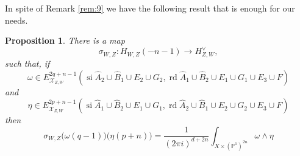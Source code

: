 \documentclass[11pt,a4paper]{amsart}
\renewcommand{\P}{\mathds{P}}
\newcommand{\caX}{\mathcal{X}}
\DeclareMathOperator{\si}{si}
\DeclareMathOperator{\rd}{rd}
\numberwithin{equation}{section}
\theoremstyle{plain}
\newtheorem{prop}{Proposition}[section]
\theoremstyle{definition}
\begin{document}
  In spite of Remark \ref{rem:9} we have the following result that is
  enough for our needs.
  \begin{prop}\label{prop:4} There is a map
    \begin{displaymath}
      \sigma_{W,Z}\colon H_{W,Z}(-n-1)\longrightarrow H_{Z,W}^{\vee},
    \end{displaymath}
    such that, if
    \begin{displaymath}
      \omega \in
          E^{2q+n-1}_{\caX_{Z,W}}(\si \widehat A_2\cup
    \widehat B_1\cup E_2\cup G_2   , \rd \widehat A_1\cup
    \widehat B_2\cup E_1\cup G_1\cup E_3\cup F)
    \end{displaymath}
and 
    \begin{displaymath}
      \eta \in
          E^{2p+n-1}_{\caX_{Z,W}}(\si \widehat A_1\cup
    \widehat B_2\cup E_1\cup G_1   , \rd \widehat A_2\cup
    \widehat B_1\cup E_2\cup G_2\cup E_3\cup F)
  \end{displaymath}
  then
  \begin{equation}\label{eq:50}
    \sigma _{W,Z}\big(\omega (q-1)\big)\Big(\eta(p+n)\Big)=
    \frac{1}{(2\pi i)^{d+2n}}\int_{X\times (\P^{1})^{2n}}\omega \wedge \eta
  \end{equation}
  \end{prop}
\end{document}
